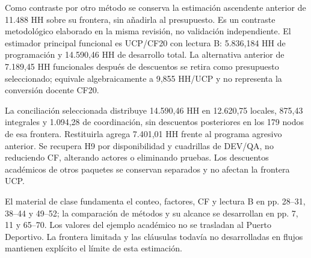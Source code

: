 Como contraste por otro método se conserva la estimación ascendente anterior de 11.488 HH sobre su frontera, sin añadirla al presupuesto. Es un contraste metodológico elaborado en la misma revisión, no validación independiente. El estimador principal funcional es UCP/CF20 con lectura B: 5.836,184 HH de programación y 14.590,46 HH de desarrollo total. La alternativa anterior de 7.189,45 HH funcionales después de descuentos se retira como presupuesto seleccionado; equivale algebraicamente a 9,855 HH/UCP y no representa la conversión docente CF20.

La conciliación seleccionada distribuye 14.590,46 HH en 12.620,75 locales, 875,43 integrales y 1.094,28 de coordinación, sin descuentos posteriores en los 179 nodos de esa frontera. Restituirla agrega 7.401,01 HH frente al programa agresivo anterior. Se recupera H9 por disponibilidad y cuadrillas de DEV/QA, no reduciendo CF, alterando actores o eliminando pruebas. Los descuentos académicos de otros paquetes se conservan separados y no afectan la frontera UCP.

El material de clase fundamenta el conteo, factores, CF y lectura B en pp. 28--31, 38--44 y 49--52; la comparación de métodos y su alcance se desarrollan en pp. 7, 11 y 65--70. Los valores del ejemplo académico no se trasladan al Puerto Deportivo. La frontera limitada y las cláusulas todavía no desarrolladas en flujos mantienen explícito el límite de esta estimación.

